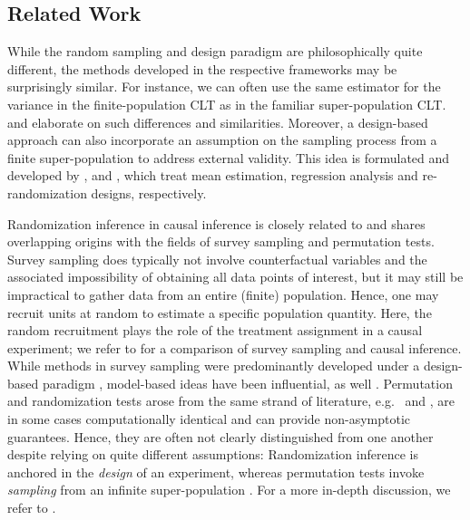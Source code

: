 \documentclass[aos]{imsart2}
\theoremstyle{plain}
\theoremstyle{definition}
\begin{document}





\subsection{Related Work} While the random sampling and design paradigm are philosophically quite different, the methods developed in the respective frameworks may be surprisingly similar. For instance, we can often use the same estimator for the variance in the finite-population CLT as in the familiar super-population CLT. \citet{imai_misunderstandings_2008} and \citet{ding_bridging_2017} elaborate on such differences and similarities. Moreover, a design-based approach can also incorporate an assumption on the sampling process from a finite super-population to address external validity. This idea is formulated and developed by \citet{miratrix_worth_2018}, \citet{abadie_samplingbased_2020} and \citet{yang_rejective_2023}, which treat mean estimation, regression analysis and re-randomization designs, respectively.

Randomization inference in causal inference is closely related to and shares overlapping origins with the fields of survey sampling and permutation tests. Survey sampling does typically not involve counterfactual variables and the associated impossibility of obtaining all data points of interest, but it may still be impractical to gather data from an entire (finite) population. Hence, one may recruit units at random to estimate a specific population quantity. Here, the random recruitment plays the role of the treatment assignment in a causal experiment; we refer to \citet{mercer_theory_2017} for a comparison of survey sampling and causal inference. While methods in survey sampling were predominantly developed under a design-based paradigm \citep{neyman_two_1934,cochran_sampling_1977}, model-based ideas have been influential, as well \citep{srndal_design-based_1978,sarndal_1992}. Permutation and randomization tests arose from the same strand of literature, e.g.\ \citet{fisher_design_1935} and \citet{pitman_significance_1937}, are in some cases computationally identical and can provide non-asymptotic guarantees. Hence, they are often not clearly distinguished from one another despite relying on quite different assumptions: Randomization inference is anchored in the \emph{design} of an experiment, whereas permutation tests invoke \emph{sampling} from an infinite super-population \citep{kempthorne_behaviour_1969,ernst_permutation_2004,lehmann_2006}. For a more in-depth discussion, we refer to \citet{zhang_2023_randomization_test}.
\end{document}

